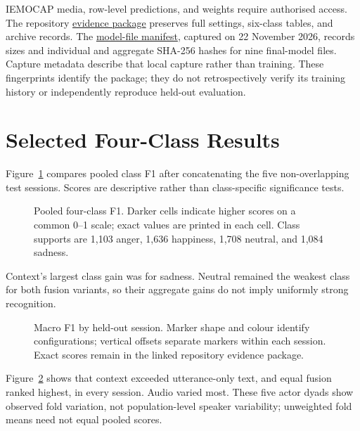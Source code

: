 IEMOCAP media, row-level predictions, and weights require authorised access. The repository \href{https://github.com/ralucabiras/emotion-aware-role-play-model/blob/main/docs/evidence-package/supplementary-model-results.md}{evidence package} preserves full settings, six-class tables, and archive records. The \href{https://github.com/ralucabiras/emotion-aware-role-play-model/blob/main/docs/evidence-package/generated/model-provenance-v1.json}{model-file manifest}, captured on 22 November 2026, records sizes and individual and aggregate SHA-256 hashes for nine final-model files. Capture metadata describe that local capture rather than training. These fingerprints identify the package; they do not retrospectively verify its training history or independently reproduce held-out evaluation.

\clearpage
\section{Selected Four-Class Results}

Figure~\ref{fig:four-class-f1} compares pooled class F1 after concatenating the five non-overlapping test sessions. Scores are descriptive rather than class-specific significance tests.

\begin{figure}[htbp]
\centering

\caption[Four-class F1 by model configuration.]{Pooled four-class F1. Darker cells indicate higher scores on a common 0--1 scale; exact values are printed in each cell. Class supports are 1,103 anger, 1,636 happiness, 1,708 neutral, and 1,084 sadness.}
\label{fig:four-class-f1}
\end{figure}

Context's largest class gain was for sadness. Neutral remained the weakest class for both fusion variants, so their aggregate gains do not imply uniformly strong recognition.

\begin{figure}[htbp]
\centering

\caption[Macro F1 by held-out session.]{Macro F1 by held-out session. Marker shape and colour identify configurations; vertical offsets separate markers within each session. Exact scores remain in the linked repository evidence package.}
\label{fig:session-fold-variation}
\end{figure}

Figure~\ref{fig:session-fold-variation} shows that context exceeded utterance-only text, and equal fusion ranked highest, in every session. Audio varied most. These five actor dyads show observed fold variation, not population-level speaker variability; unweighted fold means need not equal pooled scores.
